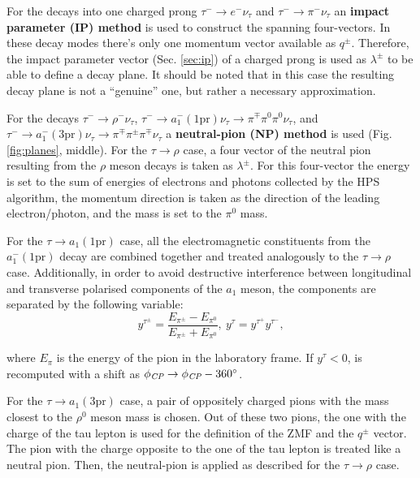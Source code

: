 For the decays into one charged prong $\tau^- \to e^- \nu_\tau$ and $\tau^- \to \pi^- \nu_\tau$ an \textbf{impact parameter (IP) method} is used to construct the spanning four-vectors. In these decay modes there's only one momentum vector available as $q^\pm$. Therefore, the impact parameter vector (Sec. \ref{sec:ip}) of a charged prong is used as $\lambda^\pm$ to be able to define a decay plane. It should be noted that in this case the resulting decay plane is not a \enquote{genuine} one, but rather a necessary approximation.  

For the decays $\tau^- \to \rho^- \nu_\tau$, $\tau^- \to a_1^-(\text{1pr}) \nu_\tau \to \pi^\mp \pi^0  \pi^0 \nu_\tau$, and $\tau^- \to a_1^-(\text{3pr})\nu_\tau \to \pi^\mp \pi^\pm \pi^\mp \nu_\tau$ a \textbf{neutral-pion (NP) method} is used (Fig. \ref{fig:planes}, middle). For the $\tau \to \rho$ case, a four vector of the neutral pion resulting from the $\rho$ meson decays is taken as $\lambda^\pm$. For this four-vector the energy is set to the sum of energies of electrons and photons collected by the HPS algorithm, the momentum direction is taken as the direction of the leading electron/photon, and the mass is set to the $\pi^0$ mass. 

For the $\tau \to a_1(\text{1pr})$ case, all the electromagnetic constituents from the $a_1^-(\text{1pr})$ decay are combined together and treated analogously to the $\tau \to \rho$ case. Additionally, in order to avoid destructive interference between longitudinal and transverse polarised components of the $a_1$ meson, the components are separated by the following variable:
\begin{equation}
    y^{\tau^\pm} = \dfrac{E_{\pi^\pm} - E_{\pi^0}}{E_{\pi^\pm} + E_{\pi^0}}, ~y^\tau = y^{\tau^+}y^{\tau^-},
\end{equation}

where $E_\pi$ is the energy of the pion in the laboratory frame. If $y^\tau < 0$, \phicp is recomputed with a shift as $\phi_{\textit{CP}} \to \phi_{\textit{CP}} - 360^\circ$.

For the $\tau \to a_1(\text{3pr})$ case, a pair of oppositely charged pions with the mass closest to the $\rho^0$ meson mass is chosen. Out of these two pions, the one with the charge of the tau lepton is used for the definition of the ZMF and the $q^\pm$ vector. The pion with the charge opposite to the one of the tau lepton is treated like a neutral pion. Then, the neutral-pion is applied as described for the $\tau \to \rho$ case. 

